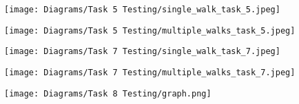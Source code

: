 \documentclass[10pt, a4paper]{article}
\begin{document}
\begin{figure}[H]
    \texttt{[image: Diagrams/Task 5 Testing/single\_walk\_task\_5.jpeg]}
    \caption{}
    \label{fig:6}
\end{figure}

\begin{figure}[H]
    \texttt{[image: Diagrams/Task 5 Testing/multiple\_walks\_task\_5.jpeg]}
    \caption{}
    \label{fig:7}
\end{figure}

\begin{figure}[H]
    \texttt{[image: Diagrams/Task 7 Testing/single\_walk\_task\_7.jpeg]}
    \caption{}
    \label{fig:8}
\end{figure}

\begin{figure}[H]
    \texttt{[image: Diagrams/Task 7 Testing/multiple\_walks\_task\_7.jpeg]}
    \caption{}
    \label{fig:9}
\end{figure}

\begin{figure}[H]
    \texttt{[image: Diagrams/Task 8 Testing/graph.png]}
    \caption{}
    \label{fig:10}
\end{figure}
\end{document}
